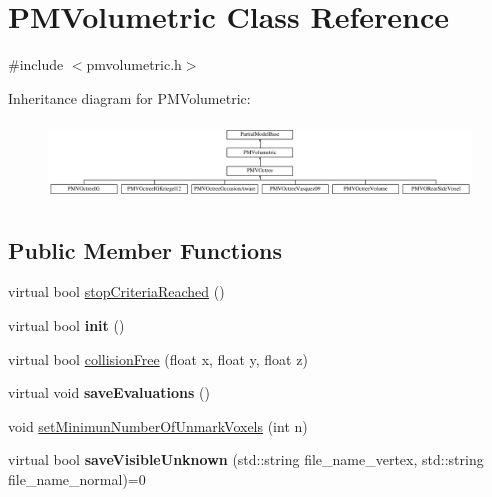 \hypertarget{classPMVolumetric}{}\section{P\+M\+Volumetric Class Reference}
\label{classPMVolumetric}


{\ttfamily \#include $<$pmvolumetric.\+h$>$}

Inheritance diagram for P\+M\+Volumetric\+:\begin{figure}[H]
\begin{center}
\leavevmode
\includegraphics[height=2.097378cm]{classPMVolumetric}
\end{center}
\end{figure}
\subsection*{Public Member Functions}
\begin{DoxyCompactItemize}
\item 
virtual bool \hyperlink{classPMVolumetric_a6995737fe93356953555dc298f3fc2f9}{stop\+Criteria\+Reached} ()
\item 
virtual bool {\bfseries init} ()\hypertarget{classPMVolumetric_a429e9e6f82c5ef158b4732ae9252faaa}{}\label{classPMVolumetric_a429e9e6f82c5ef158b4732ae9252faaa}

\item 
virtual bool \hyperlink{classPMVolumetric_a1d5d45ef61e7741f322711e8396cd7ac}{collision\+Free} (float x, float y, float z)
\item 
virtual void {\bfseries save\+Evaluations} ()\hypertarget{classPMVolumetric_ad267f345bb318517b760d7fb7cfefcc1}{}\label{classPMVolumetric_ad267f345bb318517b760d7fb7cfefcc1}

\item 
void \hyperlink{classPMVolumetric_a8ca19a4a30b6a4991314b032cde35265}{set\+Minimun\+Number\+Of\+Unmark\+Voxels} (int n)
\item 
virtual bool {\bfseries save\+Visible\+Unknown} (std\+::string file\+\_\+name\+\_\+vertex, std\+::string file\+\_\+name\+\_\+normal)=0\hypertarget{classPMVolumetric_aede738844f4e5ccc30aece6358263160}{}\label{classPMVolumetric_aede738844f4e5ccc30aece6358263160}

\end{DoxyCompactItemize}
